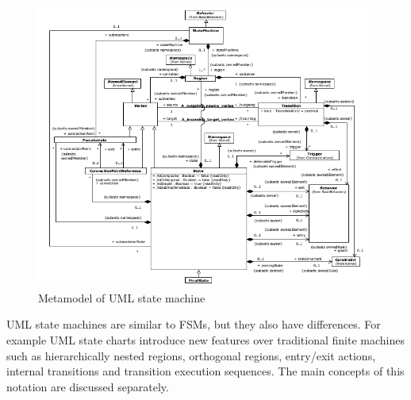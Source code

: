 \begin{figure}[htp]
\centering
\includegraphics[scale=0.6]{figures/statemachine_metamodel}
\caption{Metamodel of UML state machine \cite{omguml}}
\label{fig:statemachine_metamodel}
\end{figure}

UML state machines are similar to FSMs, but they also have differences. For example UML state charts introduce new features over traditional finite machines such as hierarchically nested regions, orthogonal regions, entry/exit actions, internal transitions and transition execution sequences. The main concepts of this notation are discussed separately.


